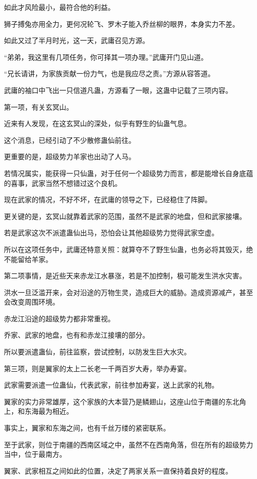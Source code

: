 \begin{this_body}
如此才风险最小，最符合他的利益。

狮子搏兔亦用全力，更何况轮飞、罗木子能入乔丝柳的眼界，本身实力不差。

如此又过了半月时光，这一天，武庸召见方源。

“弟弟，我这里有几项任务，你可择其一项办理。”武庸开门见山道。

“兄长请讲，为家族贡献一份力气，也是我应尽之责。”方源从容答道。

武庸的袖口中飞出一只信道凡蛊，方源看了一眼，这蛊中记载了三项内容。

第一项，有关玄冥山。

近来有人发现，在这玄冥山的深处，似乎有野生的仙蛊气息。

这个消息，已经引动了不少散修蛊仙前往。

更重要的是，超级势力羊家也出动了人马。

若情况属实，能获得一只仙蛊，对于任何一个超级势力而言，都是能增长自身底蕴的喜事，武家当然不想错过这个良机。

现在武家的情况，不好不坏，在武庸的领导之下，已经稳住了阵脚。

更关键的是，玄冥山就靠着武家的范围，虽然不是武家的地盘，但和武家接壤。

若是武家这次不派遣蛊仙出马，恐怕会让其他超级势力觉得武家空虚。

所以在这项任务中，武庸还特意关照：就算夺不了野生仙蛊，也务必将其毁灭，绝不能留给羊家。

第二项事情，是近些天来赤龙江水暴涨，若是不加控制，极可能发生洪水灾害。

洪水一旦泛滥开来，会对沿途的万物生灵，造成巨大的威胁。造成资源减产，甚至会改变周围环境。

赤龙江沿途的超级势力都非常重视。

乔家、武家的地盘，也有和赤龙江接壤的部分。

所以要派遣蛊仙，前往监察，尝试控制，以防发生巨大水灾。

第三项，则是翼家的太上二长老一千两百岁大寿，举办寿宴。

武家需要派遣一位蛊仙，代表武家，前往参加寿宴，送上武家的礼物。

翼家的实力非常雄厚，这个家族的大本营乃是鳞翅山，这座山位于南疆的东北角上，和东海最为相近。

事实上，翼家和东海之间，也有千丝万缕的紧密联系。

至于武家，则位于南疆的西南区域之中，虽然不在西南角落，但在所有的超级势力当中，位于最南方。

翼家、武家相互之间如此的位置，决定了两家关系一直保持着良好的程度。


\end{this_body}

